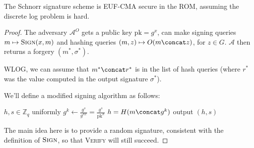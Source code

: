 \begin{theorem}
    The Schnorr signature scheme is EUF-CMA secure in the ROM, assuming the discrete log problem is hard.
\end{theorem}

\begin{proof}
    The adversary $\mathcal{A}^O$ gets a public key $\mathrm{pk} = g^x$, can make signing queries $m \mapsto \textsc{Sign}(x, m)$ and hashing queries $(m, z) \mapsto O(m \concat z)$, for $z \in G$. $\mathcal{A}$ then returns a forgery $(m^*, \sigma^*)$.
    \begin{center}
    \end{center}

    WLOG, we can assume that $m^* \concat r^*$ is in the list of hash queries (where $r^*$ was the value computed in the output signature $\sigma^*$).

    We'll define a modified signing algorithm as follows:
    \begin{algorithmic}
        \State $h, s \in \mathbb{Z}_q$ uniformly
        \State $g^k \gets \frac{g^s}{g^{hx}} = \frac{g^s}{\mathrm{pk}^h}$
        \State $h = H(m \concat g^k)$
        \State output $(h, s)$
        \EndFunction
    \end{algorithmic}
    The main idea here is to provide a random signature, consistent with the definition of $\textsc{Sign}$, so that \textsc{Verify} will still succeed.


\end{proof}
